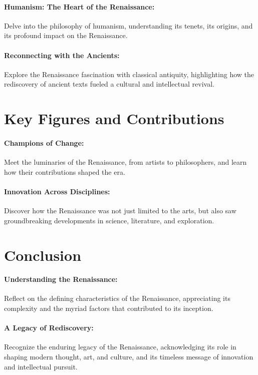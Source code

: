\documentclass[a4paper,12pt]{book}
\begin{document}
\paragraph{Humanism: The Heart of the Renaissance:}
Delve into the philosophy of humanism, understanding its tenets, its origins, and its profound impact on the Renaissance.

\paragraph{Reconnecting with the Ancients:}
Explore the Renaissance fascination with classical antiquity, highlighting how the rediscovery of ancient texts fueled a cultural and intellectual revival.

\section*{Key Figures and Contributions}

\paragraph{Champions of Change:}
Meet the luminaries of the Renaissance, from artists to philosophers, and learn how their contributions shaped the era.

\paragraph{Innovation Across Disciplines:}
Discover how the Renaissance was not just limited to the arts, but also saw groundbreaking developments in science, literature, and exploration.

\section*{Conclusion}

\paragraph{Understanding the Renaissance:}
Reflect on the defining characteristics of the Renaissance, appreciating its complexity and the myriad factors that contributed to its inception.

\paragraph{A Legacy of Rediscovery:}
Recognize the enduring legacy of the Renaissance, acknowledging its role in shaping modern thought, art, and culture, and its timeless message of innovation and intellectual pursuit.
\end{document}
